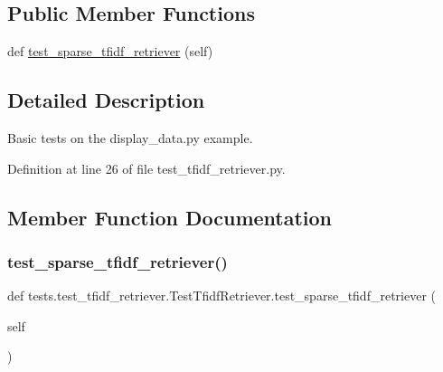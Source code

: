 \subsection*{Public Member Functions}
\begin{DoxyCompactItemize}
\item 
def \hyperlink{classtests_1_1test__tfidf__retriever_1_1TestTfidfRetriever_ad323cddfeb021a3b38a7eb4810d6ecdd}{test\+\_\+sparse\+\_\+tfidf\+\_\+retriever} (self)
\end{DoxyCompactItemize}


\subsection{Detailed Description}
\begin{DoxyVerb}Basic tests on the display_data.py example.\end{DoxyVerb}
 

Definition at line 26 of file test\+\_\+tfidf\+\_\+retriever.\+py.



\subsection{Member Function Documentation}
\mbox{\label{classtests_1_1test__tfidf__retriever_1_1TestTfidfRetriever_ad323cddfeb021a3b38a7eb4810d6ecdd}} 
\subsubsection{\texorpdfstring{test\+\_\+sparse\+\_\+tfidf\+\_\+retriever()}{test\_sparse\_tfidf\_retriever()}}
{\footnotesize\ttfamily def tests.\+test\+\_\+tfidf\+\_\+retriever.\+Test\+Tfidf\+Retriever.\+test\+\_\+sparse\+\_\+tfidf\+\_\+retriever (\begin{DoxyParamCaption}\item[{}]{self }\end{DoxyParamCaption})}



